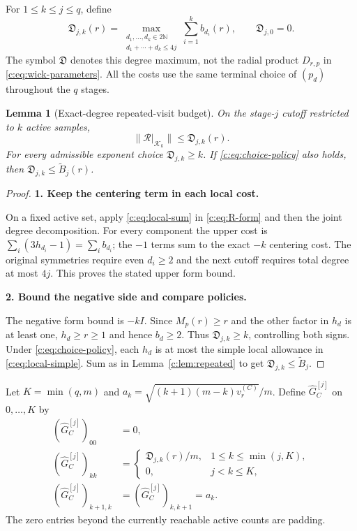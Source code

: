 \documentclass[11pt]{article}
\numberwithin{equation}{section}
\newtheorem{lemma}[theorem]{Lemma}
\theoremstyle{definition}\newtheorem{definition}[theorem]{Definition}
\theoremstyle{remark}\newtheorem{remark}[theorem]{Remark}
\newcommand{\norm}[1]{\lVert#1\rVert}\newcommand{\ip}[2]{\langle#1,#2\rangle}
\newcommand{\step}[1]{\par\addvspace{.65\baselineskip}\Needspace{4\baselineskip}\noindent\textbf{#1}\par\nobreak\smallskip}
\begin{document}
For $1\le k\le j\le q$, define
\begin{equation}\label{c:eq:wick-budget}
 \mathfrak D_{j,k}(r)=
 \max_{\substack{d_1,\ldots,d_k\in2\mathbb N\\d_1+\cdots+d_k\le4j}}
       \sum_{i=1}^k b_{d_i}(r),\qquad \mathfrak D_{j,0}=0.
\end{equation}
The symbol $\mathfrak D$ denotes this degree maximum, not the radial product
$D_{r,p}$ in \eqref{c:eq:wick-parameters}. All the costs use the same terminal
choice of $(p_d)$ throughout the $q$ stages.

\begin{lemma}[Exact-degree repeated-visit budget]\label{c:lem:wick-budget}
On the stage-$j$ cutoff restricted to $k$ active samples,
\[
 \norm{\mathcal R|_{\mathcal K_k}}\le\mathfrak D_{j,k}(r).
\]
For every admissible exponent choice $\mathfrak D_{j,k}\ge k$.
If \eqref{c:eq:choice-policy} also holds, then
$\mathfrak D_{j,k}\le\widetilde B_j(r)$.
\end{lemma}
\begin{proof}
\step{1. Keep the centering term in each local cost.}
On a fixed active set, apply \eqref{c:eq:local-sum} in \eqref{c:eq:R-form}
and then the joint degree decomposition. For every component the upper cost is
$\sum_i(3h_{d_i}-1)=\sum_i b_{d_i}$; the $-1$ terms sum to the exact $-k$
centering cost. The original symmetries require even $d_i\ge2$ and the next
cutoff requires total degree at most $4j$. This proves the stated upper form bound.

\step{2. Bound the negative side and compare policies.}
The negative form bound is $-kI$. Since $M_p(r)\ge r$ and the other factor
in $h_d$ is at least one, $h_d\ge r\ge1$ and hence $b_d\ge2$.
Thus $\mathfrak D_{j,k}\ge k$, controlling both signs. Under
\eqref{c:eq:choice-policy}, each $h_d$ is at most the simple local allowance
in \eqref{c:eq:local-simple}. Sum as in Lemma~\ref{c:lem:repeated} to get
$\mathfrak D_{j,k}\le\widetilde B_j$.
\end{proof}

Let $K=\min(q,m)$ and $a_k=\sqrt{(k+1)(m-k)v_r^{(C)}}/m$. Define
$\widehat G_C^{[j]}$ on $0,\ldots,K$ by
\begin{align}
 (\widehat G_C^{[j]})_{00}&=0,\nonumber\\
 (\widehat G_C^{[j]})_{kk}&=
 \begin{cases}\mathfrak D_{j,k}(r)/m,&1\le k\le\min(j,K),\\
 0,&j<k\le K,\end{cases}\nonumber\\
 (\widehat G_C^{[j]})_{k+1,k}&=(\widehat G_C^{[j]})_{k,k+1}=a_k.
 \label{c:eq:wick-stage-matrix}
\end{align}
The zero entries beyond the currently reachable active counts are padding.
\end{document}

